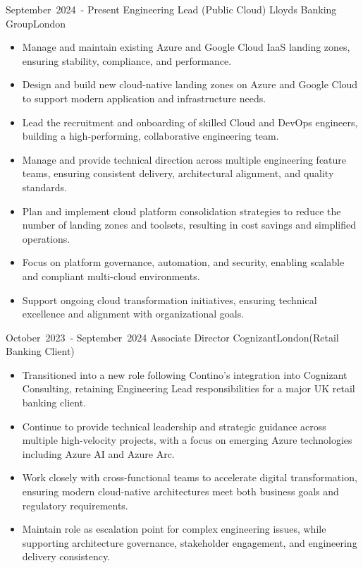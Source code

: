
\edef\hc{\string:}
\cventry %
  {\mbox{September 2024 -} \mbox{Present}}
  {Engineering Lead (Public Cloud)}
  {Lloyds Banking Group}{London}{}
  {  
    \begin{itemize}
     \item Manage and maintain existing Azure and Google Cloud IaaS landing zones, ensuring stability, compliance, and performance.
     \item Design and build new cloud-native landing zones on Azure and Google Cloud to support modern application and infrastructure needs.
     \item Lead the recruitment and onboarding of skilled Cloud and DevOps engineers, building a high-performing, collaborative engineering team.
     \item Manage and provide technical direction across multiple engineering feature teams, ensuring consistent delivery, architectural alignment, and quality standards.
     \item Plan and implement cloud platform consolidation strategies to reduce the number of landing zones and toolsets, resulting in cost savings and simplified operations.
     \item Focus on platform governance, automation, and security, enabling scalable and compliant multi-cloud environments.
     \item Support ongoing cloud transformation initiatives, ensuring technical excellence and alignment with organizational goals.
    \end{itemize}
    \bigskip
  }

\cventry %
  {\mbox{October 2023 -} \mbox{September 2024}}
  {Associate Director}
  {Cognizant}{London}{(Retail Banking Client)}
  {
    \begin{itemize}
     \item Transitioned into a new role following Contino’s integration into Cognizant Consulting, retaining Engineering Lead responsibilities for a major UK retail banking client.
     \item Continue to provide technical leadership and strategic guidance across multiple high-velocity projects, with a focus on emerging Azure technologies including Azure AI and Azure Arc.
     \item Work closely with cross-functional teams to accelerate digital transformation, ensuring modern cloud-native architectures meet both business goals and regulatory requirements.
     \item Maintain role as escalation point for complex engineering issues, while supporting architecture governance, stakeholder engagement, and engineering delivery consistency.
    \end{itemize}
    \bigskip
  }

